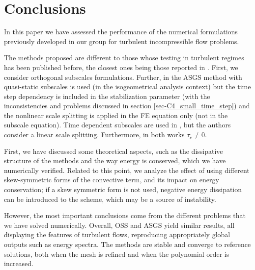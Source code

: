 %
\section{Conclusions}
\label{sec-C4_conclusions}

In this paper we have assessed the performance of the numerical formulations previously developed in our group \cite{codina_stabilized_2002,codina_time_2007,Codina-chap-2011,Principe2009} for turbulent incompressible flow problems. 

The methods proposed are different to those whose testing in turbulent regimes has been published before, the closest ones being those reported in \cite{bazilevs_variational_2007,gamnitzer_time-dependent_2010}. First, we consider orthogonal subscales formulations. Further, in \cite{bazilevs_variational_2007} the ASGS method with quasi-static subscales is used (in the isogeometrical analysis context) but the time step dependency is included in the stabilization parameter (with the inconsistencies and problems discussed in section \ref{sec-C4_small_time_step}) and the nonlinear scale splitting is applied in the FE equation only (not in the subscale equation). Time dependent subscales are used in \cite{gamnitzer_time-dependent_2010}, but the authors consider a linear scale splitting. Furthermore, in both works $\tau_c \neq 0$. 

First, we have discussed some theoretical aspects, such as the dissipative structure of the methods and the way energy is conserved, which we have numerically verified. Related to this point, we analyze the effect of using different skew-symmetric forms of the convective term, and its impact on energy conservation; if a skew symmetric form is not used, negative energy dissipation can be introduced to the scheme, which may be a source of instability. 

However, the most important conclusions come from the different problems that we have solved numerically. Overall, OSS and ASGS yield similar results, all displaying the features of turbulent flows, reproducing appropriately global outputs such as energy spectra. The methods are stable and converge to reference solutions, both when the mesh is refined and when the polynomial order is increased. 


